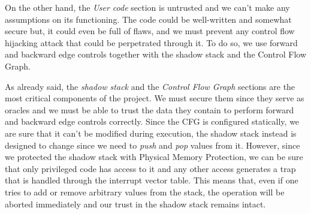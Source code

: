 On the other hand, the \textit{User code} section is untrusted and we can't make
any assumptions on its functioning. The code could be well-written and somewhat secure
but, it could even be full of flaws, and we must prevent any control flow hijacking
attack that could be perpetrated through it. To do so, we use forward and backward
edge controls together with the shadow stack and the Control Flow Graph.

As already said, the \textit{shadow stack} and the \textit{Control Flow Graph}
sections are the most critical components of the project. We must secure them since
they serve as oracles and we must be able to trust the data they contain to perform
forward and backward edge controls correctly. Since the CFG is configured
statically, we are sure that it can't be modified during execution, the shadow
stack instead is designed to change since we need to \textit{push} and \textit{pop}
values from it. However, since we protected the shadow stack with Physical
Memory Protection, we can be sure that only privileged code has access to it and
any other access generates a trap that is handled through the interrupt vector table.
This means that, even if one tries to add or remove arbitrary values from the stack,
the operation will be aborted immediately and our trust in the shadow stack
remains intact.

